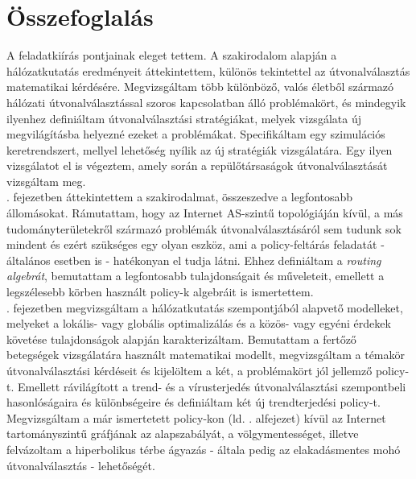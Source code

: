 \chapter{Összefoglalás}\label{summary}

A feladatkiírás pontjainak eleget tettem. A szakirodalom alapján a hálózatkutatás eredményeit áttekintettem, különös tekintettel az útvonalválasztás matematikai kérdésére. Megvizsgáltam több különböző, valós életből származó hálózati útvonalválasztással szoros kapcsolatban álló problémakört, és mindegyik ilyenhez definiáltam útvonalválasztási stratégiákat, melyek vizsgálata új megvilágításba helyezné ezeket a problémákat. Specifikáltam egy szimulációs keretrendszert, mellyel lehetőség nyílik az új stratégiák vizsgálatára. Egy ilyen vizsgálatot el is végeztem, amely során a repülőtársaságok útvonalválasztását vizsgáltam meg.\\

. fejezetben áttekintettem a szakirodalmat, összeszedve a legfontosabb állomásokat. Rámutattam, hogy az Internet AS-szintű topológiáján kívül, a más tudományterületekről származó problémák útvonalválasztásáról sem tudunk sok mindent és ezért szükséges egy olyan eszköz, ami a policy-feltárás feladatát - általános esetben is - hatékonyan el tudja látni. Ehhez definiáltam a \emph{routing algebrát}, bemutattam a legfontosabb tulajdonságait és műveleteit, emellett a legszélesebb körben használt policy-k algebráit is ismertettem.\\

. fejezetben megvizsgáltam a hálózatkutatás szempontjából alapvető modelleket, melyeket a lokális- vagy globális optimalizálás és a közös- vagy egyéni érdekek követése tulajdonságok alapján karakterizáltam. Bemutattam a fertőző betegségek vizsgálatára használt matematikai modellt, megvizsgáltam a témakör útvonalválasztási kérdéseit és kijelöltem a két, a problémakört jól jellemző policy-t. Emellett rávilágított a trend- és a vírusterjedés útvonalválasztási szempontbeli hasonlóságaira és különbségeire és definiáltam két új trendterjedési policy-t.\newline
Megvizsgáltam a már ismertetett policy-kon (ld. . alfejezet) kívül az Internet tartományszintű gráfjának az alapszabályát, a völgymentességet, illetve felvázoltam a hiperbolikus térbe ágyazás - általa pedig az elakadásmentes mohó útvonalválasztás - lehetőségét.\\

